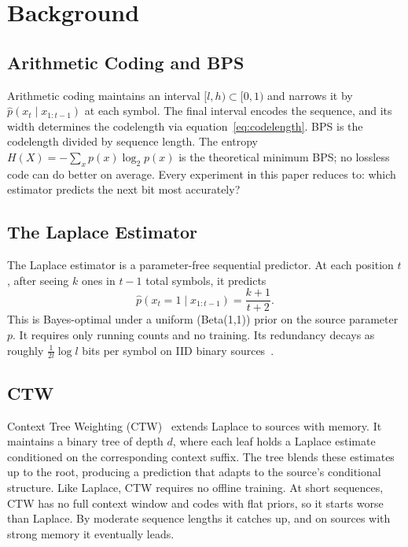 \documentclass[onecolumn,english,12pt]{IEEEtran}
\begin{document}
\section{Background}
\label{sec:background}

\subsection{Arithmetic Coding and BPS}

Arithmetic coding maintains an interval $[l, h) \subset [0,1)$ and narrows it by $\hat{p}(x_t \mid x_{1:t-1})$ at each symbol.
The final interval encodes the sequence, and its width determines the codelength via equation~\eqref{eq:codelength}.
BPS is the codelength divided by sequence length. The entropy $H(X) = -\sum_x p(x)\log_2 p(x)$ is the theoretical minimum BPS; no lossless code can do better on average.
Every experiment in this paper reduces to: which estimator predicts the next bit most accurately?

\subsection{The Laplace Estimator}

The Laplace estimator is a parameter-free sequential predictor.
At each position $t$, after seeing $k$ ones in $t-1$ total symbols, it predicts
\begin{equation}
  \hat{p}(x_t = 1 \mid x_{1:t-1}) = \frac{k+1}{t+2}.
  \label{eq:laplace}
\end{equation}
This is Bayes-optimal under a uniform (Beta(1,1)) prior on the source parameter $p$.
It requires only running counts and no training.
Its redundancy decays as roughly $\frac{1}{2l} \log l$ bits per symbol on IID binary sources~\cite{CoverThomas}.

\subsection{CTW}

Context Tree Weighting (CTW)~\cite{gabeschamberg} extends Laplace to sources with memory.
It maintains a binary tree of depth $d$, where each leaf holds a Laplace estimate conditioned on the corresponding context suffix.
The tree blends these estimates up to the root, producing a prediction that adapts to the source's conditional structure.
Like Laplace, CTW requires no offline training.
At short sequences, CTW has no full context window and codes with flat priors, so it starts worse than Laplace.
By moderate sequence lengths it catches up, and on sources with strong memory it eventually leads.
\end{document}
